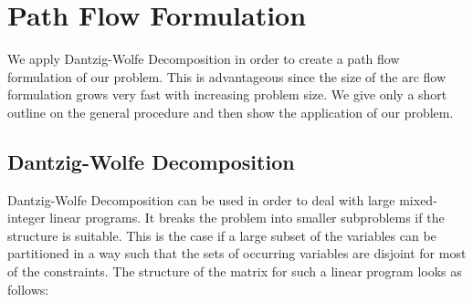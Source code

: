 \section{Path Flow Formulation}

We apply Dantzig-Wolfe Decomposition in order to create a path flow formulation of our problem. This is advantageous since the size of the arc flow formulation grows very fast with increasing problem size. We give only a short outline on the general procedure and then show the application of our problem.

\subsection{Dantzig-Wolfe Decomposition}

Dantzig-Wolfe Decomposition can be used in order to deal with large mixed-integer linear programs. It breaks the problem into smaller subproblems if the structure is suitable. This is the case if a large subset of the variables can be partitioned in a way such that the sets of occurring variables are disjoint for most of the constraints. The structure of the matrix for such a linear program looks as follows:

